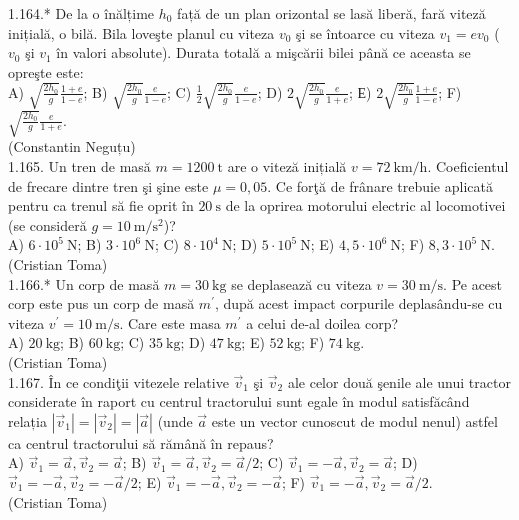 1.164.* De la o înălțime $h_{0}$ față de un plan orizontal se lasă liberă, fară viteză inițială, o bilă. Bila loveşte planul cu viteza $v_{0}$ şi se întoarce cu viteza $v_{1}=e v_{0}$ ($v_{0}$ şi $v_{1}$ în valori absolute). Durata totală a mişcării bilei până ce aceasta se opreşte este:\\ A) $\sqrt{\frac{2 h_{0}}{g}} \frac{1+e}{1-e}$; B) $\sqrt{\frac{2 h_{0}}{g}} \frac{e}{1-e}$; C) $\frac{1}{2} \sqrt{\frac{2 h_{0}}{g}} \frac{e}{1-e}$; D) $2 \sqrt{\frac{2 h_{0}}{g}} \frac{e}{1+e}$; Е) $2 \sqrt{\frac{2 h_{0}}{g}} \frac{1+e}{1-e}$; F) $\sqrt{\frac{2 h_{0}}{g}} \frac{e}{1+e}$.\\ (Constantin Neguțu)\\

1.165. Un tren de masă $m=1200 \mathrm{~t}$ are o viteză inițială $v=72 \mathrm{~km} / \mathrm{h}$. Coeficientul de frecare dintre tren şi şine este $\mu=0,05$. Ce forţă de frânare trebuie aplicată pentru ca trenul să fie oprit în $20 \mathrm{~s}$ de la oprirea motorului electric al locomotivei (se consideră $g=10 \mathrm{~m} / \mathrm{s}^{2}$)?\\ A) $6 \cdot 10^{5} \mathrm{~N}$; B) $3 \cdot 10^{6} \mathrm{~N}$; C) $8 \cdot 10^{4} \mathrm{~N}$; D) $5 \cdot 10^{5} \mathrm{~N}$; E) $4,5 \cdot 10^{6} \mathrm{~N}$; F) $8,3 \cdot 10^{5} \mathrm{~N}$.\\ (Cristian Toma)\\

1.166.* Un corp de masă $m=30 \mathrm{~kg}$ se deplasează cu viteza $v=30 \mathrm{~m} / \mathrm{s}$. Pe acest corp este pus un corp de masă $m^{\prime}$, după acest impact corpurile deplasându-se cu viteza $v^{\prime}=10 \mathrm{~m} / \mathrm{s}$. Care este masa $m^{\prime}$ a celui de-al doilea corp?\\ A) $20 \mathrm{~kg}$; B) $60 \mathrm{~kg}$; C) $35 \mathrm{~kg}$; D) $47 \mathrm{~kg}$; E) $52 \mathrm{~kg}$; F) $74 \mathrm{~kg}$.\\ (Cristian Toma)\\

1.167. În ce condiţii vitezele relative $\vec{v}_{1}$ şi $\vec{v}_{2}$ ale celor două şenile ale unui tractor considerate în raport cu centrul tractorului sunt egale în modul satisfăcând relația $\left|\vec{v}_{1}\right|=\left|\vec{v}_{2}\right|=|\vec{a}|$ (unde $\vec{a}$ este un vector cunoscut de modul nenul) astfel ca centrul tractorului să rămână în repaus?\\ A) $\vec{v}_{1}=\vec{a}, \vec{v}_{2}=\vec{a}$; B) $\vec{v}_{1}=\vec{a}, \vec{v}_{2}=\vec{a} / 2$; C) $\vec{v}_{1}=-\vec{a}, \vec{v}_{2}=\vec{a}$; D) $\vec{v}_{1}=-\vec{a}, \vec{v}_{2}=-\vec{a} / 2$; E) $\vec{v}_{1}=-\vec{a}, \vec{v}_{2}=-\vec{a}$; F) $\vec{v}_{1}=-\vec{a}, \vec{v}_{2}=\vec{a} / 2$.\\ (Cristian Toma)\\

